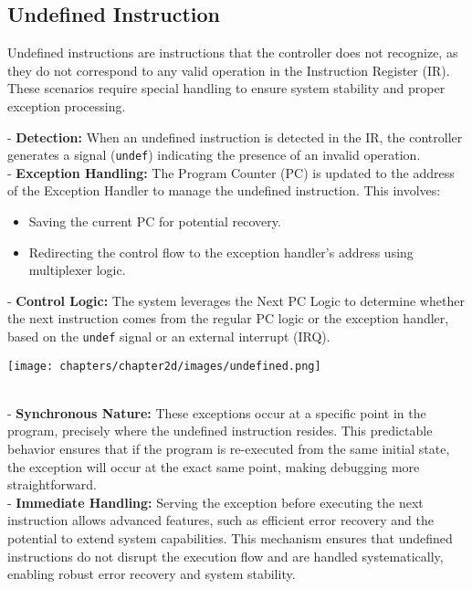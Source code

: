 \subsection{Undefined Instruction}

Undefined instructions are instructions that the controller does not recognize, as they do not correspond to any valid operation in the Instruction Register (IR). These scenarios require special handling to ensure system stability and proper exception processing.

\vspace{0.5cm}
\begin{minipage}[htp]{0.35\textwidth}
- \textbf{Detection:} When an undefined instruction is detected in the IR, the controller generates a signal (\texttt{undef}) indicating the presence of an invalid operation. \\
- \textbf{Exception Handling:} The Program Counter (PC) is updated to the address of the Exception Handler to manage the undefined instruction. This involves: \\
\begin{itemize}
\item Saving the current PC for potential recovery.
\item Redirecting the control flow to the exception handler's address using multiplexer logic.
\end{itemize}
- \textbf{Control Logic:} The system leverages the Next PC Logic to determine whether the next instruction comes from the regular PC logic or the exception handler, based on the \texttt{undef} signal or an external interrupt (IRQ).
\end{minipage}
\hfill
\vline
\hfill
\begin{minipage}[htp]{0.55\textwidth}
    \begin{center}
        \texttt{[image: chapters/chapter2d/images/undefined.png]}
    \end{center}
\end{minipage} \\
\vspace{0.5cm}
- \textbf{Synchronous Nature:} These exceptions occur at a specific point in the program, precisely where the undefined instruction resides. This predictable behavior ensures that if the program is re-executed from the same initial state, the exception will occur at the exact same point, making debugging more straightforward. \\ \vspace{0.5cm}
- \textbf{Immediate Handling:} Serving the exception before executing the next instruction allows advanced features, such as efficient error recovery and the potential to extend system capabilities.
\vspace{0.5cm}
This mechanism ensures that undefined instructions do not disrupt the execution flow and are handled systematically, enabling robust error recovery and system stability.

